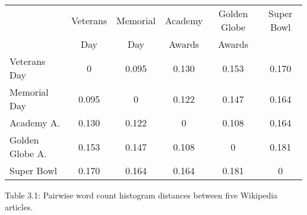 \begin{table}
\begin{tabular}{l c c c c c} \hline \hline  & Veterans & Memorial & Academy & Golden Globe & Super Bowl \\  & Day & Day & Awards & Awards & \\ \hline Veterans Day & 0 & 0.095 & 0.130 & 0.153 & 0.170 \\ Memorial Day & 0.095 & 0 & 0.122 & 0.147 & 0.164 \\ Academy A. & 0.130 & 0.122 & 0 & 0.108 & 0.164 \\ Golden Globe A. & 0.153 & 0.147 & 0.108 & 0 & 0.181 \\ Super Bowl & 0.170 & 0.164 & 0.164 & 0.181 & 0 \\ \hline \hline \end{tabular}
\end{table}
Table 3.1: Pairwise word count histogram distances between five Wikipedia articles.

 
